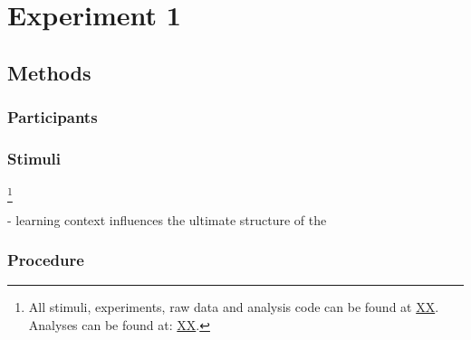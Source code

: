 \documentclass[man]{apa2}
\begin{document}






\section{Experiment 1}

\subsection{Methods}

\subsubsection{Participants} 
\subsubsection{Stimuli}
\footnote{All stimuli, experiments, raw data and analysis code can be found at \url{XX}. 
Analyses can be found at: \url{XX}.} 

- learning context influences the ultimate structure of the 

\subsubsection{Procedure}
\end{document}
